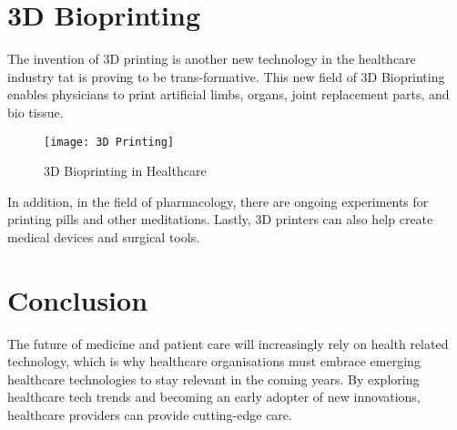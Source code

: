 \documentclass[12pt]{article}
\begin{document}
\section{3D Bioprinting}

The invention of 3D printing is another new technology in the healthcare industry tat is proving to be trans-formative. This new field of 3D Bioprinting enables physicians to print artificial limbs, organs, joint replacement parts, and bio tissue.

\begin{figure}[h]
\centering
\texttt{[image: 3D Printing]}
\caption{3D Bioprinting in Healthcare}
\end{figure}

 In addition, in the field of pharmacology, there are ongoing experiments for printing pills and other meditations. Lastly, 3D printers can also help create medical devices and surgical tools. 

\section{Conclusion}

The future of medicine and patient care will increasingly rely on health related technology, which is why healthcare organisations must embrace emerging healthcare technologies to stay relevant in the coming years. By exploring healthcare tech trends and becoming an early adopter of new innovations, healthcare providers can provide cutting-edge care.      
\end{document}
